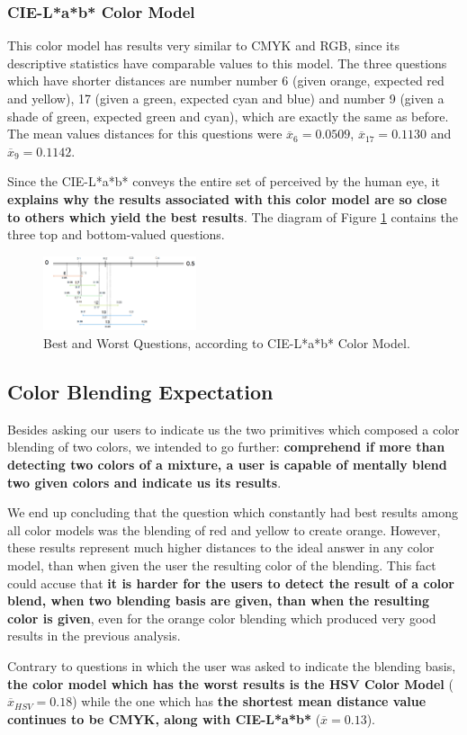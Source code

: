 \subsubsection{CIE-L*a*b* Color Model}
%
This color model has results very similar to CMYK and RGB, since its descriptive statistics have comparable
values to this model. The three questions which have shorter distances are number number 6 (given orange,
expected red and yellow), 17 (given a green, expected cyan and blue) and number 9 (given a shade
of green, expected green and cyan), which are exactly the same as before. The mean values distances for
this questions were $\overline{x}_{6} = 0.0509$, $\overline{x}_{17} = 0.1130$ and $\overline{x}_{9} = 0.1142$. \par
%
Since the CIE-L*a*b* conveys the entire set of perceived by the human eye, it \textbf{explains why the
results associated with this color model are so close to others which yield the best results}. The diagram
of Figure \ref{fig:lab_analysis} contains the three top and bottom-valued questions.
%
\begin{figure}[!htbp]
  \centering
  \includegraphics[width=0.4\textwidth]{images/lab_questions_analysis.png}
  \caption{Best and Worst Questions, according to CIE-L*a*b* Color Model.}
  \label{fig:lab_analysis}
\end{figure}
%
\subsection{Color Blending Expectation}
%
Besides asking our users to indicate us the two primitives which composed a color blending of two colors,
we intended to go further: \textbf{comprehend if more than detecting two colors of a mixture, a user
is capable of mentally blend two given colors and indicate us its results}. \par
%
We end up concluding that the question which constantly had best results among all color models was the
blending of red and yellow to create orange. However, these results represent much
higher distances to the ideal answer in any color model, than when given the user the resulting color of
the blending. This fact could accuse that \textbf{it is harder for the users to detect the result of a
color blend, when two blending basis are given, than when the resulting color is given}, even for the
orange color blending which produced very good results in the previous analysis. \par
%
Contrary to questions in which the user was asked to indicate the blending basis, \textbf{the color model
which has the worst results is the HSV Color Model} ($\overline{x}_{HSV} = 0.18$) while the one which has
\textbf{the shortest mean distance value continues to be CMYK, along with CIE-L*a*b*} ($\overline{x} = 0.13$).
%
